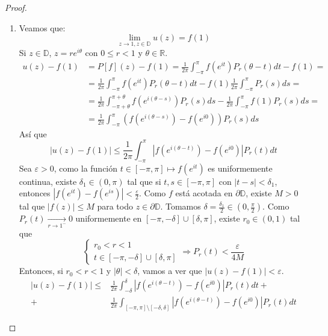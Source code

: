 \begin{proof}
\begin{enumerate}
        \item Veamos que:
              $$\lim_{z \to 1, z \in \mathbb{D}} u(z) = f(1)$$
              Si $z \in \mathbb{D}$, $z = re^{i\theta}$ con $0 \leq r < 1$ y $\theta \in \mathbb{R}$.
              \begin{align*}
                  u(z) - f(1) & = P[f](z) - f(1) = \frac{1}{2\pi} \int_{-\pi}^\pi f(e^{it})P_r(\theta-t)dt - f(1) =                                         \\
                              & = \frac{1}{2\pi} \int_{-\pi}^\pi f(e^{it})P_r(\theta-t)dt - f(1)\frac{1}{2\pi} \int_{-\pi}^\pi P_r(s)ds =                   \\
                              & = \frac{1}{2\pi} \int_{-\pi+\theta}^{\pi+\theta} f(e^{i(\theta-s)})P_r(s)ds - \frac{1}{2\pi} \int_{-\pi}^\pi f(1)P_r(s)ds = \\
                              & = \frac{1}{2\pi} \int_{-\pi}^\pi \left(f(e^{i(\theta-s)}) - f(e^{i0})\right)P_r(s)ds
              \end{align*}
              Así que
              $$|u(z)-f(1)| \leq \frac{1}{2\pi} \int_{-\pi}^\pi \left|f\left(e^{i(\theta-t)}\right) - f\left(e^{i0}\right)\right|P_r(t)dt$$
              Sea $\varepsilon > 0$, como la función $t \in [-\pi, \pi] \mapsto f(e^{it})$ es uniformemente continua, existe $\delta_1 \in (0, \pi)$ tal que si $t, s \in [-\pi, \pi]$ con $|t-s| < \delta_1$, entonces $|f(e^{it})-f(e^{is})| < \frac{\varepsilon}{2}$.
              Como $f$ está acotada en $\partial\mathbb{D}$, existe $M > 0$ tal que $|f(z)| \leq M$ para todo $z \in \partial\mathbb{D}$.
              Tomamos $\delta = \frac{\delta_1}{2} \in \left(0, \frac{\pi}{2}\right)$.
              Como $P_r(t) \xrightarrow[r \to 1^-]{} 0$ uniformemente en $[-\pi, -\delta] \cup [\delta, \pi]$, existe $r_0 \in (0, 1)$ tal que
              $$\begin{cases}
                      r_0 < r < 1 \\
                      t \in [-\pi, -\delta] \cup [\delta, \pi]
                  \end{cases} \Rightarrow P_r(t) < \frac{\varepsilon}{4M}$$
              Entonces, si $r_0 < r < 1$ y $|\theta| < \delta$, vamos a ver que $|u(z)-f(1)| < \varepsilon$.
              \begin{align*}
                  |u(z)-f(1)| \leq & \frac{1}{2\pi} \int_{-\delta}^\delta \left|f\left(e^{i(\theta-t)}\right) - f\left(e^{i0}\right)\right|P_r(t)dt +                        \\
                  +                & \frac{1}{2\pi} \int_{[-\pi, \pi] \setminus [-\delta, \delta]} \left|f\left(e^{i(\theta-t)}\right) - f\left(e^{i0}\right)\right|P_r(t)dt

\end{align*}
\end{enumerate}
\end{proof}
